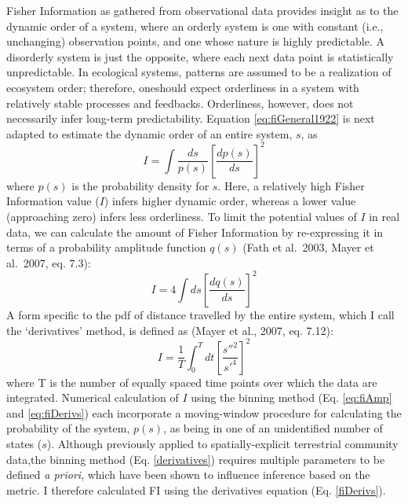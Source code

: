 \documentclass[12pt,twoside,openany]{reedthesis}
\begin{document}
Fisher Information as gathered from observational data provides insight as to the dynamic order of a system, where an orderly system is one with constant (i.e., unchanging) observation points, and one whose nature is highly predictable. A disorderly system is just the opposite, where each next data point is statistically unpredictable. In ecological systems, patterns are assumed to be a realization of ecosystem order; therefore, oneshould expect orderliness in a system with relatively stable processes and feedbacks. Orderliness, however, does not necessarily infer long-term predictability. Equation \eqref{eq:fiGeneral1922} is next adapted to estimate the dynamic order of an entire system, \(s\), as
\begin{equation} 
  I = \int \frac{ds}{p(s)}\left[\frac{dp(s)}{ds}\right]^2
\end{equation}
where \(p(s)\) is the probability density for \(s\). Here, a relatively high Fisher Information value (\(I\)) infers higher dynamic order, whereas a lower value (approaching zero) infers less orderliness. To limit the potential values of \(I\) in real data, we can calculate the amount of Fisher Information by re-expressing it in terms of a probability amplitude function \(q(s)\) (Fath et al.~2003, Mayer et al.~2007, eq. 7.3):
\begin{equation}
  I = 4 \int ds\left[\frac{dq(s)}{ds}\right]^2
  \label{eq:fiAmp}
\end{equation}
A form specific to the pdf of distance travelled by the entire system, which I call the `derivatives' method, is defined as (Mayer et al., 2007, eq. 7.12):
\begin{equation}
  I = \frac{1}{T} \int_0^T dt\left[\frac{s''^2}{s'^4}\right]^2
  \label{eq:fiDerivs}
\end{equation}
where T is the number of equally spaced time points over which the data are integrated. Numerical calculation of \(I\) using the binning method (Eq. \eqref{eq:fiAmp} and \eqref{eq:fiDerivs}) each incorporate a moving-window procedure for calculating the probability of the system, \(p(s)\), as being in one of an unidentified number of states (\(s\)). Although previously applied to spatially-explicit terrestrial community data,the binning method (Eq. \ref{derivatives}) requires multiple parameters to be defined \emph{a priori}, which have been shown to influence inference based on the metric. I therefore calculated FI using the derivatives equation (Eq. \ref{fiDerivs}).
\end{document}
